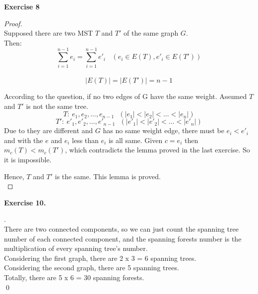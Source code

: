 \documentclass[12pt, notitlepage]{article}
\newenvironment{sol}
  {\par\vspace{3mm}\noindent{\it Solution}.}{\qed}
\begin{document}
\textbf{Exercise 8}\\
\begin{proof}
	\ \\
	Supposed there are two MST $T$ and $T'$ of the same graph $G$.\\
	Then:
	\begin{equation*}
		\sum_{i=1}^{n-1}e_i=\sum_{i=1}^{n-1}e'_i\ \ \ \ (e_i\in E(T), e'_i\in E(T'))
	\end{equation*}\
	\begin{equation*}
		|E(T)|=|E(T')|=n-1
	\end{equation*}
	
	\qquad According to the question, if no two edges of G have the same weight. Assumed $T$ and $T'$ is not the same tree.
	\begin{equation*}
		T:\ e_1, e_2, ..., e_{n-1}\ \ \ (|e_1|<|e_2|<...<|e_n|)
	\end{equation*}
	\begin{equation*}
		T':\ e'_1, e'_2, ..., e'_{n-1}\ \ \ (|e'_1|<|e'_2|<...<|e'_n|)
	\end{equation*}
	\qquad Due to they are different and $G$ has no same weight edge, there must be $e_i<e'_i$ and with the $e$ and $e_i$ less than $e_i$ is all same. Given $c=e_i$ then $m_c(T) < m_c(T')$, which contradicts the lemma proved in the last exercise. So it is impossible.
	
	\qquad Hence, $T$ and $T'$ is the same. This lemma is proved.\\
	\end{proof}

\textbf{Exercise 10.}
\begin{sol}\\
There are two connected components, so we can just count the spanning tree number of each connected component, and the spanning forests number is the multiplication of every spanning tree's number.\\
Considering the first graph, there are 2 x 3 = 6 spanning trees.\\
Considering the second graph, there are 5 spanning trees.\\
Totally, there are 5 x 6 = 30 spanning forests.\\
\end{sol}
\end{document}
